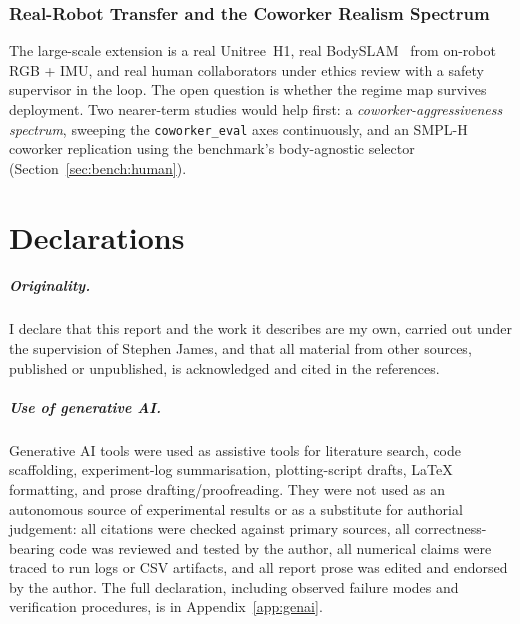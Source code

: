 \documentclass[11pt,a4paper]{report}
\newcommand{\bodyslampp}{BodySLAM\nolinebreak[4]\hspace{-.05em}\raisebox{.2ex}{\scriptsize ++}}
\begin{document}
\subsection{Real-Robot Transfer and the Coworker Realism Spectrum}
\label{sec:fw:realbody}
\label{sec:fw:embodiment}

The large-scale extension is a real Unitree~H1, real
\bodyslampp{}~\cite{henning2023bodyslampp} from on-robot RGB + IMU,
and real human collaborators under ethics review with a safety
supervisor in the loop. The open question is whether the regime map
survives deployment. Two nearer-term studies would help first: a
\emph{coworker-aggressiveness spectrum}, sweeping the
\texttt{coworker\_eval} axes continuously, and an
SMPL-H~\cite{romero2017smplh} coworker replication using the
benchmark's body-agnostic selector (Section~\ref{sec:bench:human}).


\clearpage
{}
{}


\clearpage
\chapter*{Declarations}

\paragraph{Originality.}
I declare that this report and the work it describes are my own,
carried out under the supervision of Stephen James, and that all
material from other sources, published or unpublished, is
acknowledged and cited in the references.

\paragraph{Use of generative AI.}
Generative AI tools were used as assistive tools for literature search,
code scaffolding, experiment-log summarisation, plotting-script drafts,
\LaTeX{} formatting, and prose drafting/proofreading. They were not
used as an autonomous source of experimental results or as a substitute
for authorial judgement: all citations were checked against primary
sources, all correctness-bearing code was reviewed and tested by the
author, all numerical claims were traced to run logs or CSV artifacts,
and all report prose was edited and endorsed by the author. The full
declaration, including observed failure modes and verification
procedures, is in Appendix~\ref{app:genai}.
\end{document}
